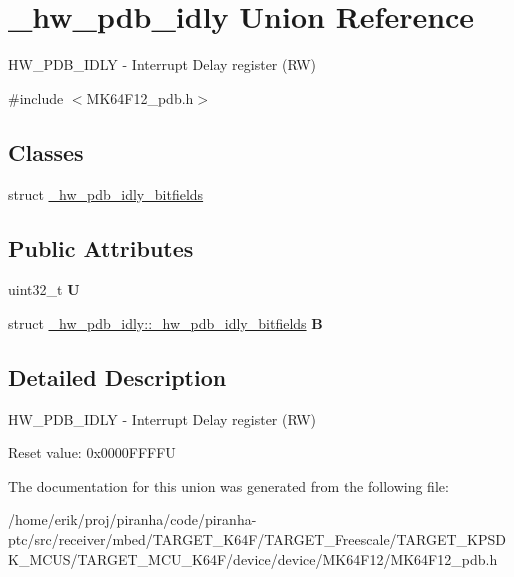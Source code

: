 \hypertarget{union__hw__pdb__idly}{}\section{\+\_\+hw\+\_\+pdb\+\_\+idly Union Reference}
\label{union__hw__pdb__idly}


H\+W\+\_\+\+P\+D\+B\+\_\+\+I\+D\+LY -\/ Interrupt Delay register (RW)  




{\ttfamily \#include $<$M\+K64\+F12\+\_\+pdb.\+h$>$}

\subsection*{Classes}
\begin{DoxyCompactItemize}
\item 
struct \hyperlink{struct__hw__pdb__idly_1_1__hw__pdb__idly__bitfields}{\+\_\+hw\+\_\+pdb\+\_\+idly\+\_\+bitfields}
\end{DoxyCompactItemize}
\subsection*{Public Attributes}
\begin{DoxyCompactItemize}
\item 
uint32\+\_\+t {\bfseries U}\hypertarget{union__hw__pdb__idly_a2a62702a3194d03159f332d215e3df63}{}\label{union__hw__pdb__idly_a2a62702a3194d03159f332d215e3df63}

\item 
struct \hyperlink{struct__hw__pdb__idly_1_1__hw__pdb__idly__bitfields}{\+\_\+hw\+\_\+pdb\+\_\+idly\+::\+\_\+hw\+\_\+pdb\+\_\+idly\+\_\+bitfields} {\bfseries B}\hypertarget{union__hw__pdb__idly_a82ebee4dfda6857c4bd045342d6b0bf6}{}\label{union__hw__pdb__idly_a82ebee4dfda6857c4bd045342d6b0bf6}

\end{DoxyCompactItemize}


\subsection{Detailed Description}
H\+W\+\_\+\+P\+D\+B\+\_\+\+I\+D\+LY -\/ Interrupt Delay register (RW) 

Reset value\+: 0x0000\+F\+F\+F\+FU 

The documentation for this union was generated from the following file\+:\begin{DoxyCompactItemize}
\item 
/home/erik/proj/piranha/code/piranha-\/ptc/src/receiver/mbed/\+T\+A\+R\+G\+E\+T\+\_\+\+K64\+F/\+T\+A\+R\+G\+E\+T\+\_\+\+Freescale/\+T\+A\+R\+G\+E\+T\+\_\+\+K\+P\+S\+D\+K\+\_\+\+M\+C\+U\+S/\+T\+A\+R\+G\+E\+T\+\_\+\+M\+C\+U\+\_\+\+K64\+F/device/device/\+M\+K64\+F12/M\+K64\+F12\+\_\+pdb.\+h\end{DoxyCompactItemize}
